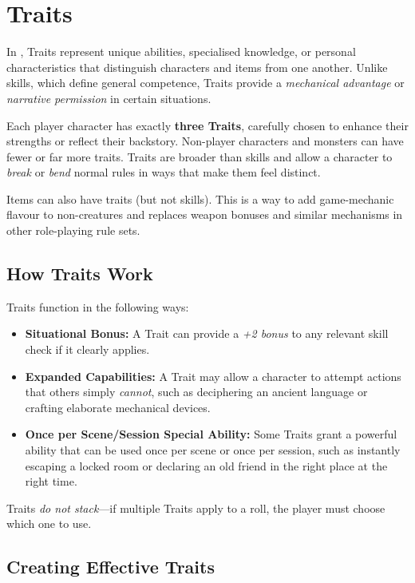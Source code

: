 \section{Traits}
\label{core:traits}

In \wyrd, Traits represent unique abilities, specialised knowledge, or personal characteristics that distinguish characters and items from one another. Unlike skills, which define general competence, Traits provide a \emph{mechanical advantage} or \emph{narrative permission} in certain situations.

Each player character has exactly \textbf{three Traits}, carefully chosen to enhance their strengths or reflect their backstory. Non-player characters and monsters can have fewer or far more traits. Traits are broader than skills and allow a character to \emph{break} or \emph{bend} normal rules in ways that make them feel distinct.

Items can also have traits (but not skills). This is a way to add game-mechanic flavour to non-creatures and replaces weapon bonuses and similar mechanisms in other role-playing rule sets.

\subsection{How Traits Work}

Traits function in the following ways:

\begin{itemize}
    \item \textbf{Situational Bonus:} A Trait can provide a \emph{+2 bonus} to any relevant skill check if it clearly applies.
    \item \textbf{Expanded Capabilities:} A Trait may allow a character to attempt actions that others simply \emph{cannot}, such as deciphering an ancient language or crafting elaborate mechanical devices.
    \item \textbf{Once per Scene/Session Special Ability:} Some Traits grant a powerful ability that can be used once per scene or once per session, such as instantly escaping a locked room or declaring an old friend in the right place at the right time.
\end{itemize}

Traits \emph{do not stack}—if multiple Traits apply to a roll, the player must choose which one to use.

\subsection{Creating Effective Traits}

